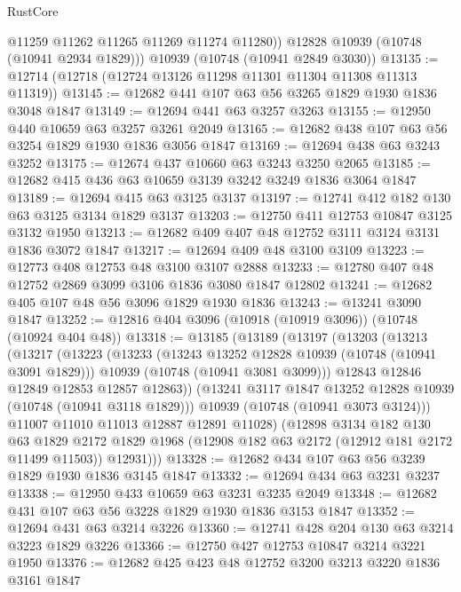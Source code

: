 \begin{lexlean}{RustCore}
\begin{coremodule}
          @11259
          @11262
          @11265
          @11269
          @11274
          @11280))
      @12828
      @10939
      (@10748 (@10941 @2934 @1829)))
    @10939
    (@10748 (@10941 @2849 @3030))
@13135 := @12714 (@12718 (@12724 @13126 @11298 @11301 @11304 @11308 @11313 @11319))
@13145 := @12682 @441 @107 @63 @56 @3265 @1829 @1930 @1836 @3048 @1847
@13149 := @12694 @441 @63 @3257 @3263
@13155 := @12950 @440 @10659 @63 @3257 @3261 @2049
@13165 := @12682 @438 @107 @63 @56 @3254 @1829 @1930 @1836 @3056 @1847
@13169 := @12694 @438 @63 @3243 @3252
@13175 := @12674 @437 @10660 @63 @3243 @3250 @2065
@13185 := @12682 @415 @436 @63 @10659 @3139 @3242 @3249 @1836 @3064 @1847
@13189 := @12694 @415 @63 @3125 @3137
@13197 := @12741 @412 @182 @130 @63 @3125 @3134 @1829 @3137
@13203 := @12750 @411 @12753 @10847 @3125 @3132 @1950
@13213 := @12682 @409 @407 @48 @12752 @3111 @3124 @3131 @1836 @3072 @1847
@13217 := @12694 @409 @48 @3100 @3109
@13223 := @12773 @408 @12753 @48 @3100 @3107 @2888
@13233 := @12780 @407 @48 @12752 @2869 @3099 @3106 @1836 @3080 @1847 @12802
@13241 := @12682 @405 @107 @48 @56 @3096 @1829 @1930 @1836
@13243 := @13241 @3090 @1847
@13252 := @12816 @404 @3096 (@10918 (@10919 @3096)) (@10748 (@10924 @404 @48))
@13318 := @13185
    (@13189
      (@13197
        (@13203
          (@13213
            (@13217
              (@13223
                (@13233
                  (@13243 @13252 @12828 @10939 (@10748 (@10941 @3091 @1829)))
                  @10939
                  (@10748 (@10941 @3081 @3099)))
                @12843
                @12846
                @12849
                @12853
                @12857
                @12863))
            (@13241 @3117 @1847 @13252 @12828 @10939 (@10748 (@10941 @3118 @1829)))
            @10939
            (@10748 (@10941 @3073 @3124)))
          @11007
          @11010
          @11013
          @12887
          @12891
          @11028)
        (@12898
          @3134
          @182
          @130
          @63
          @1829
          @2172
          @1829
          @1968
          (@12908 @182 @63 @2172 (@12912 @181 @2172 @11499 @11503))
          @12931)))
@13328 := @12682 @434 @107 @63 @56 @3239 @1829 @1930 @1836 @3145 @1847
@13332 := @12694 @434 @63 @3231 @3237
@13338 := @12950 @433 @10659 @63 @3231 @3235 @2049
@13348 := @12682 @431 @107 @63 @56 @3228 @1829 @1930 @1836 @3153 @1847
@13352 := @12694 @431 @63 @3214 @3226
@13360 := @12741 @428 @204 @130 @63 @3214 @3223 @1829 @3226
@13366 := @12750 @427 @12753 @10847 @3214 @3221 @1950
@13376 := @12682 @425 @423 @48 @12752 @3200 @3213 @3220 @1836 @3161 @1847

\end{coremodule}
\end{lexlean}
